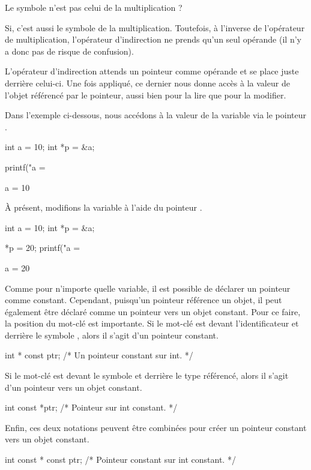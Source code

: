 \begin{questionbox}
 Le symbole \mybox{*} n'est pas celui de la multiplication ? 
\end{questionbox}

Si, c'est aussi le symbole de la multiplication. Toutefois, à l'inverse
de l'opérateur de multiplication, l'opérateur d'indirection ne prends
qu'un seul opérande (il n'y a donc pas de risque de confusion).

L'opérateur d'indirection attends un pointeur comme opérande et se place
juste derrière celui-ci. Une fois appliqué, ce dernier nous donne accès
à la valeur de l'objet référencé par le pointeur, aussi bien pour la
lire que pour la modifier.

Dans l'exemple ci-dessous, nous accédons à la valeur de la variable
 via le pointeur .

\begin{C}
int a = 10;
int *p = &a;

printf("a = %
\end{C}

\begin{C}
a = 10
\end{C}

À présent, modifions la variable  à l'aide du pointeur
.

\begin{C}
int a = 10;
int *p = &a;

*p = 20;
printf("a = %
\end{C}

\begin{C}
a = 20
\end{C}

\begin{infobox}
Comme pour n'importe quelle variable,
il est possible de déclarer un pointeur comme constant. Cependant,
puisqu'un pointeur référence un objet, il peut également être déclaré
comme un pointeur vers un objet constant. Pour ce faire, la position du
mot-clé  est importante. Si le
mot-clé est devant l'identificateur et derrière le symbole \mybox{*},
alors il s'agit d'un pointeur constant.
\begin{C}
int * const ptr; /* Un pointeur constant sur int. */
\end{C}

Si le mot-clé est devant le symbole \mybox{*} et derrière le type référencé, alors il s'agit d'un pointeur vers un objet
constant. 

\begin{C}
int const *ptr; /* Pointeur sur int constant. */
\end{C}

Enfin, ces deux notations peuvent être combinées
pour créer un pointeur constant vers un objet constant. 

\begin{C}
int const * const ptr; /* Pointeur constant sur int constant. */
\end{C}
\end{infobox}

